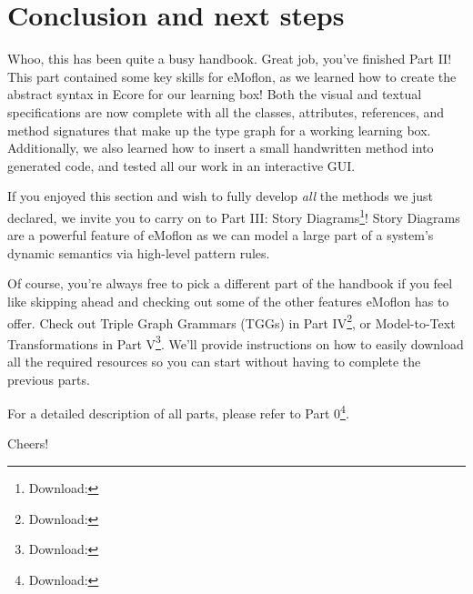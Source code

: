 \newpage
\section{Conclusion and next steps}
\genHeader

\vspace{0.5cm}

Whoo, this has been quite a busy handbook. Great job, you've finished Part II! This part contained some key skills for eMoflon, as we learned how to create
the abstract syntax in Ecore for our learning box! Both the visual and textual specifications are now complete with all the classes, attributes, references, and
method signatures that make up the type graph for a working learning box. Additionally, we also learned how to insert a small handwritten method into generated
code, and tested all our work in an interactive GUI.

If you enjoyed this section and wish to fully develop \emph{all} the methods we just declared, we invite you to carry on to Part III: Story
Diagrams\footnote{Download: \dlPartThree}! Story Diagrams are a powerful feature of eMoflon as we can model a large part of a system's dynamic semantics via high-level pattern rules. 


Of course, you're always free to pick a different part of the handbook if you feel like skipping ahead and checking out some of the other features eMoflon has
to offer. Check out Triple Graph Grammars (TGGs)  in Part IV\footnote{Download: \dlPartFour}, or Model-to-Text Transformations in Part V\footnote{Download: \dlPartFive}. We'll provide instructions on how to easily download
all the required resources so you can start without having to complete the previous parts.

For a detailed description of all parts, please refer to Part 0\footnote{Download: \dlPartZero}.

\vspace{1.0cm}

Cheers!